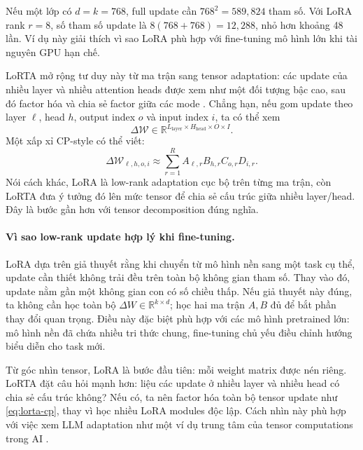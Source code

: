\begin{example}
Nếu một lớp có $d=k=768$, full update cần $768^2=589{,}824$ tham số. Với LoRA rank
$r=8$, số tham số update là $8(768+768)=12{,}288$, nhỏ hơn khoảng 48 lần. Ví dụ này
giải thích vì sao LoRA phù hợp với fine-tuning mô hình lớn khi tài nguyên GPU hạn chế.
\end{example}

LoRTA mở rộng tư duy này từ ma trận sang tensor adaptation: các update của nhiều layer
và nhiều attention heads được xem như một đối tượng bậc cao, sau đó factor hóa và chia
sẻ factor giữa các mode \cite{hounie2024lorta}. Chẳng hạn, nếu gom update theo layer
$\ell$, head $h$, output index $o$ và input index $i$, ta có thể xem
\begin{equation}
    \Delta\mathcal{W}
    \in
    \mathbb{R}^{L_{\mathrm{layer}} \times H_{\mathrm{head}} \times O \times I}.
\end{equation}
Một xấp xỉ CP-style có thể viết:
\begin{equation}
    \Delta\mathcal{W}_{\ell,h,o,i}
    \approx
    \sum_{r=1}^{R}
    A_{\ell,r} B_{h,r} C_{o,r} D_{i,r}.
    \label{eq:lorta-cp}
\end{equation}
Nói cách khác, LoRA là low-rank adaptation cục bộ trên từng ma trận, còn LoRTA đưa ý
tưởng đó lên mức tensor để chia sẻ cấu trúc giữa nhiều layer/head. Đây là bước gần hơn
với tensor decomposition đúng nghĩa.

\paragraph{Vì sao low-rank update hợp lý khi fine-tuning.}
LoRA dựa trên giả thuyết rằng khi chuyển từ mô hình nền sang một task cụ thể, update
cần thiết không trải đều trên toàn bộ không gian tham số. Thay vào đó, update nằm gần
một không gian con có số chiều thấp. Nếu giả thuyết này đúng, ta không cần học toàn bộ
$\Delta W\in\mathbb{R}^{k\times d}$; học hai ma trận $A,B$ đủ để bắt phần thay đổi quan
trọng. Điều này đặc biệt phù hợp với các mô hình pretrained lớn: mô hình nền đã chứa
nhiều tri thức chung, fine-tuning chủ yếu điều chỉnh hướng biểu diễn cho task mới.

Từ góc nhìn tensor, LoRA là bước đầu tiên: mỗi weight matrix được nén riêng. LoRTA đặt
câu hỏi mạnh hơn: liệu các update ở nhiều layer và nhiều head có chia sẻ cấu trúc
không? Nếu có, ta nên factor hóa toàn bộ tensor update như \eqref{eq:lorta-cp}, thay vì
học nhiều LoRA modules độc lập. Cách nhìn này phù hợp với việc xem LLM adaptation như
một ví dụ trung tâm của tensor computations trong AI
\cite{chrysos2025tutorial,hounie2024lorta}.

